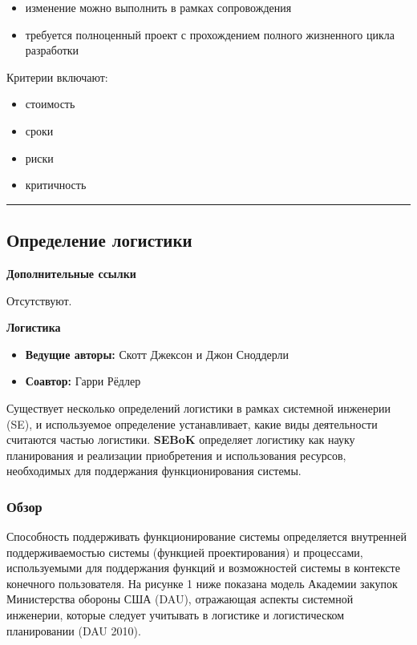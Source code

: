 \documentclass[14pt,a4paper]{extarticle}
\begin{document}
\begin{itemize}
\item изменение можно выполнить в рамках сопровождения
\item требуется полноценный проект с прохождением полного жизненного цикла разработки
\end{itemize}

Критерии включают:

\begin{itemize}
\item стоимость
\item сроки
\item риски
\item критичность
\end{itemize}

\hrule


\subsection{Определение логистики}

\textbf{Дополнительные ссылки}

Отсутствуют.

\textbf{Логистика}

\begin{itemize}
\item \textbf{Ведущие авторы:} Скотт Джексон и Джон Сноддерли
\item \textbf{Соавтор:} Гарри Рёдлер
\end{itemize}

Существует несколько определений логистики в рамках системной инженерии (SE), и используемое определение устанавливает, какие виды деятельности считаются частью логистики. \textbf{SEBoK} определяет логистику как науку планирования и реализации приобретения и использования ресурсов, необходимых для поддержания функционирования системы.

\subsubsection{Обзор}

Способность поддерживать функционирование системы определяется внутренней поддерживаемостью системы (функцией проектирования) и процессами, используемыми для поддержания функций и возможностей системы в контексте конечного пользователя. На рисунке 1 ниже показана модель Академии закупок Министерства обороны США (DAU), отражающая аспекты системной инженерии, которые следует учитывать в логистике и логистическом планировании (DAU 2010).
\end{document}
